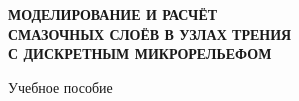 \begin{titlepage}
\thispagestyle{empty}

\centering

\null\vfill

{\textbf{МОДЕЛИРОВАНИЕ И РАСЧЁТ\\[0.3em]
СМАЗОЧНЫХ СЛОЁВ В УЗЛАХ ТРЕНИЯ\\[0.3em]
С ДИСКРЕТНЫМ МИКРОРЕЛЬЕФОМ}\par}

\vspace{1cm}
{\normalsize Учебное пособие\par}

\vfill

\end{titlepage}
